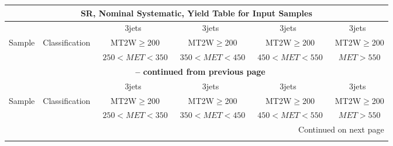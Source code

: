 \documentclass{article}
\begin{document}
 
 
 
 
\pagebreak 

 
 
 
 
\begin{longtable}{|l|c|c|c|c|c|} 
 
\multicolumn{6}{c}{ SR, Nominal Systematic, Yield Table for Input Samples }\\* \hline 
 &  & 3jets  & 3jets  & 3jets  & 3jets \\* 
Sample & Classification  & ~MT2W$\ge$200  & ~MT2W$\ge$200  & ~MT2W$\ge$200  & ~MT2W$\ge$200 \\* 
 &  & ~$250<MET<350$  & ~$350<MET<450$  & ~$450<MET<550$  & ~$MET>550$ \\* 
\hline \hline 
\endfirsthead 
 
\multicolumn{6}{c}{{\bfseries \tablename\ \thetable{} -- continued from previous page}}\\* \hline 
 &  & 3jets  & 3jets  & 3jets  & 3jets \\* 
Sample & Classification  & ~MT2W$\ge$200  & ~MT2W$\ge$200  & ~MT2W$\ge$200  & ~MT2W$\ge$200 \\* 
 &  & ~$250<MET<350$  & ~$350<MET<450$  & ~$450<MET<550$  & ~$MET>550$ \\* 
\hline \hline 
\endhead 
 
\multicolumn{6}{|r|}{{Continued on next page}}\\* \hline 
\endfoot 
 
 
\endlastfoot 
 

\end{longtable}
\end{document}
